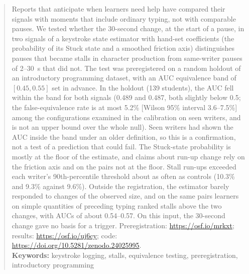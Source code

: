 \begin{abstract}
Reports that anticipate when learners need help have compared their signals with moments that include ordinary typing,
not with comparable pauses. We tested whether the 30-second change, at the start of a pause, in two signals of a keystroke state
estimator with hand-set coefficients (the probability of its Stuck state and a smoothed friction axis) distinguishes
pauses that became stalls in character production from same-writer pauses of 2--30~s that did not. The test was
preregistered on a random holdout of an introductory programming dataset, with an AUC equivalence band of
$[0.45, 0.55]$ set in advance. In the holdout (139 students), the AUC fell within the band for both signals (0.489 and
0.487, both slightly below 0.5; the false-equivalence rate is at most 5.2\% [Wilson 95\% interval 3.6--7.5\%] among the
configurations examined in the calibration on seen writers, and is not an upper bound over the whole null). Seen
writers had shown the AUC inside the band under an older definition, so this is a confirmation, not a test of a
prediction that could fail. The Stuck-state probability is mostly at the floor of the estimate, and claims about run-up
change rely on the friction axis and on the pairs not at the floor. Stall run-ups exceeded each writer's 90th-percentile
threshold about as often as controls (10.3\% and 9.3\% against 9.6\%). Outside the registration, the estimator barely responded to changes of the
observed size, and on the same pairs learners on simple quantities of preceding typing ranked stalls above the two
changes, with AUCs of about 0.54--0.57. On this input, the 30-second change gave no basis for a trigger. Preregistration: \url{https://osf.io/mrkxt}; results:
\url{https://osf.io/uj6cy}; code: \url{https://doi.org/10.5281/zenodo.24025995}.\\

{\parindent0pt
\textbf{Keywords:} keystroke logging, stalls, equivalence testing, preregistration, introductory programming
}
\end{abstract}
